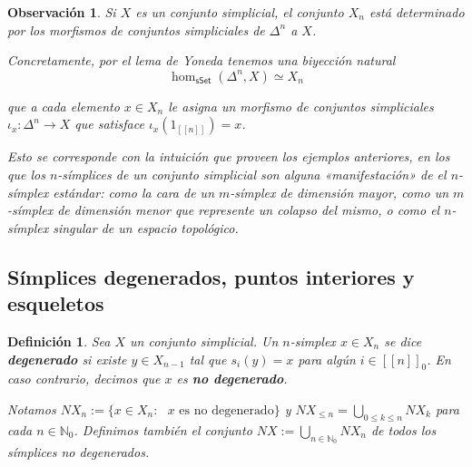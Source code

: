 \documentclass[11pt]{report}
\theoremstyle{colored}
\newtheorem{definition}{Definición}[section]
\newtheorem{remark}{Observación}[section]
\newcommand{\N}{\mathbb{N}}
\newcommand{\nat}[1]{[\![#1]\!]}
\newcommand{\ord}[1]{\nat{#1}}
\newcommand{\natzero}[1]{\nat{#1}_0}
\newcommand{\cat}[1]{\mathsf{#1}}
\renewcommand{\ss}[1]{\Delta^{#1}}
\begin{document}
\begin{remark} Si $X$ es un conjunto simplicial, el conjunto $X_n$ está determinado por los morfismos de conjuntos simpliciales de $\ss{n}$ a $X$. 

Concretamente, por el lema de Yoneda tenemos una biyección natural
\[
\hom_{\cat{sSet}}(\ss{n},X) \simeq X_n
\]

que a cada elemento $x \in X_n$ le asigna un morfismo de conjuntos simpliciales $\iota_x : \ss{n} \to X$ que satisface $\iota_x(1_{\ord{n}}) = x$. 

Esto se corresponde con la intuición que proveen los ejemplos anteriores, en los que los $n$-símplices de un conjunto simplicial son alguna «manifestación» de el $n$-símplex estándar: como la cara de un $m$-símplex de dimensión mayor, como un $m$-símplex de dimensión menor que represente un colapso del mismo, o como el $n$-símplex singular de un espacio topológico.\\
\end{remark}


\subsection{Símplices degenerados, puntos interiores y esqueletos}

\begin{definition} Sea $X$ un conjunto simplicial. Un $n$-simplex $x \in X_n$ se dice \textbf{degenerado} si existe $y \in X_{n-1}$ tal que $s_i(y) = x$ para algún $i \in \natzero{n}$. En caso contrario, decimos que $x$ es \textbf{no degenerado}. 

Notamos $NX_n := \{x \in X_n : \text{ $x$ es no degenerado}\}$ y $NX_{\leq n} = \bigcup_{0 \leq k \leq n}NX_k$ para cada $n \in \N_0$. Definimos también el conjunto $NX := \bigcup_{n \in \N_0}NX_n$ de todos los símplices no degenerados.
\end{definition}
\end{document}
